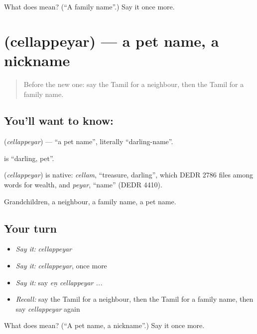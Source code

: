\begin{tcolorbox}[breakable,colback=teal!4,colframe=teal!35!black,title={Before you move on}]
What does   mean? (\textquotedblleft{}A family name\textquotedblright{}.) Say it once more.
\end{tcolorbox}
\section[\texorpdfstring{\ta{செல்லப்பெயர்} (cellappeyar)}{செல்லப்பெயர் (cellappeyar)}]{ (cellappeyar) — a pet name, a nickname}

\label{lesson:TA-C103-petname}



\begin{quote}
Before the new one: say the Tamil for a neighbour, then the Tamil for a family name.
\end{quote}

\subsection*{You'll want to know: }
\textbf{} (\emph{cellappeyar}) — \textquotedblleft{}a pet name\textquotedblright{}, literally \textquotedblleft{}darling-name\textquotedblright{}.

\textbf{} is \textquotedblleft{}darling, pet\textquotedblright{}.

\begin{cousinweb}
\textbf{} (\emph{cellappeyar}) is native: \emph{cellam}, \textquotedblleft{}treasure, darling\textquotedblright{}, which DEDR 2786 files among words for wealth, and \emph{peyar}, \textquotedblleft{}name\textquotedblright{} (DEDR 4410).
\end{cousinweb}

\begin{grammarlens}[title={What you've built}]
Grandchildren, a neighbour, a family name, a pet name.
\end{grammarlens}

\subsection*{Your turn}
\begin{itemize}
\raggedright
  \item \emph{Say it:} \emph{cellappeyar}
  \item \emph{Say it:} \emph{cellappeyar}, once more
  \item \emph{Say it:} say \emph{eṉ cellappeyar ...}
  \item \emph{Recall:} say the Tamil for a neighbour, then the Tamil for a family name, then say \emph{cellappeyar} again
\end{itemize}

\begin{tcolorbox}[breakable,colback=teal!4,colframe=teal!35!black,title={Before you move on}]
What does  mean? (\textquotedblleft{}A pet name, a nickname\textquotedblright{}.) Say it once more.
\end{tcolorbox}
